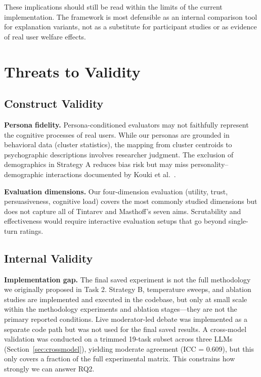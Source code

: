 \documentclass[sigconf,nonacm]{acmart}
\begin{document}
These implications should still be read within the limits of the current implementation. The framework is most defensible as an internal comparison tool for explanation variants, not as a substitute for participant studies or as evidence of real user welfare effects.

\section{Threats to Validity}
\label{sec:threats}

\subsection{Construct Validity}

\textbf{Persona fidelity.} Persona-conditioned evaluators may not faithfully represent the cognitive processes of real users. While our personas are grounded in behavioral data (cluster statistics), the mapping from cluster centroids to psychographic descriptions involves researcher judgment. The exclusion of demographics in Strategy A reduces bias risk but may miss personality--demographic interactions documented by Kouki et al.~\cite{kouki2019}.

\textbf{Evaluation dimensions.} Our four-dimension evaluation (utility, trust, persuasiveness, cognitive load) covers the most commonly studied dimensions but does not capture all of Tintarev and Masthoff's seven aims. Scrutability and effectiveness would require interactive evaluation setups that go beyond single-turn ratings.

\subsection{Internal Validity}

\textbf{Implementation gap.} The final saved experiment is not the full methodology we originally proposed in Task 2. Strategy B, temperature sweeps, and ablation studies are implemented and executed in the codebase, but only at small scale within the methodology experiments and ablation stages---they are not the primary reported conditions. Live moderator-led debate was implemented as a separate code path but was not used for the final saved results. A cross-model validation was conducted on a trimmed 19-task subset across three LLMs (Section~\ref{sec:crossmodel}), yielding moderate agreement (ICC = 0.609), but this only covers a fraction of the full experimental matrix. This constrains how strongly we can answer RQ2.
\end{document}
